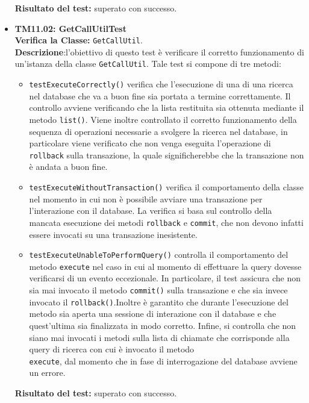 \begin{itemize}
\begin{itemize}
\end{itemize}
\textbf{Risultato del test:} superato con successo.


\item \textbf{TM11.02: GetCallUtilTest}\\
\textbf{Verifica la Classe:} \texttt{GetCallUtil}.\\
\textbf{Descrizione}:l'obiettivo di questo test è verificare il corretto funzionamento di un'istanza della classe \texttt{GetCallUtil}.
Tale test si compone di tre metodi:
\begin{itemize}
\item \texttt{testExecuteCorrectly()} verifica che l'esecuzione di una di una ricerca nel database che va a buon fine  sia portata a termine correttamente. 
Il controllo avviene verificando che la lista restituita sia ottenuta mediante il metodo \texttt{list()}. 
Viene inoltre controllato il corretto funzionamento della sequenza di operazioni necessarie a svolgere la ricerca nel database, in particolare viene verificato che non venga eseguita l'operazione di \texttt{rollback} sulla transazione, la quale significherebbe che la transazione non è andata a buon fine.

\item \texttt{testExecuteWithoutTransaction()}
verifica il comportamento della classe nel momento in cui non è possibile avviare una transazione per l'interazione con il database.
La verifica si basa sul controllo della mancata esecuzione dei metodi \texttt{rollback} e \texttt{commit}, che non devono infatti essere invocati su una transazione inesistente.

\item \texttt{testExecuteUnableToPerformQuery()}
controlla il comportamento del metodo \texttt{execute} nel caso in cui al momento di effettuare la query dovesse verificarsi di un evento eccezionale. In particolare, il test assicura che non sia mai invocato il metodo \texttt{commit()} sulla transazione e che sia invece invocato il \texttt{rollback()}.Inoltre è garantito che durante l'esecuzione del metodo sia aperta una sessione di interazione con il database e che quest'ultima sia finalizzata in modo corretto. Infine, si controlla che non siano mai invocati i metodi sulla lista di chiamate che corrisponde alla query di ricerca con cui è invocato il metodo \\ \texttt{execute}, dal momento che in fase di interrogazione del database avviene un errore.

\end{itemize}
\textbf{Risultato del test:} superato con successo.


\end{itemize}
